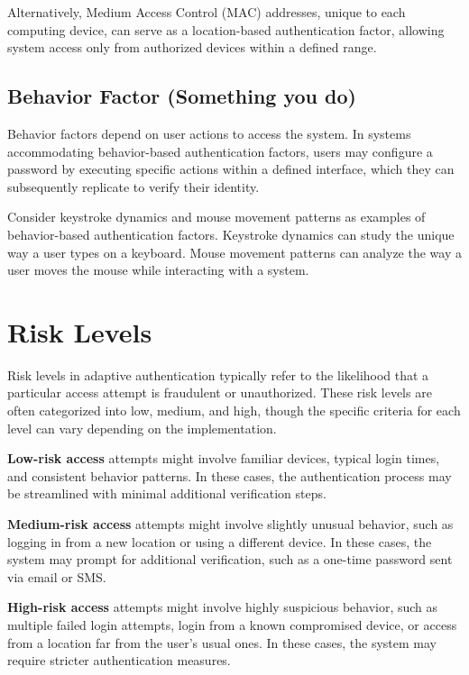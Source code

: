 Alternatively, Medium Access Control (MAC) addresses, unique to each computing device, can serve as a location-based authentication factor, allowing system access only from authorized devices within a defined range.

\newpage
\subsection{Behavior Factor (Something you do)}
Behavior factors depend on user actions to access the system. In systems accommodating behavior-based authentication factors, users may configure a password by executing specific actions within a defined interface, which they can subsequently replicate to verify their identity.

Consider keystroke dynamics and mouse movement patterns as examples of behavior-based authentication factors.
Keystroke dynamics can study the unique way a user types on a keyboard.
Mouse movement patterns can analyze the way a user moves the mouse while interacting with a system. \cite{auth-factors-aratek, auth-factors-sumologic,auth-factors-globalknowledge} 

\section{Risk Levels}
Risk levels in adaptive authentication typically refer to the likelihood that a particular access attempt is fraudulent or unauthorized.
These risk levels are often categorized into low, medium, and high, though the specific criteria for each level can vary depending on the implementation.

\textbf{Low-risk access} attempts might involve familiar devices, typical login times, and consistent behavior patterns. In these cases, the authentication process may be streamlined with minimal additional verification steps.

\textbf{Medium-risk access} attempts might involve slightly unusual behavior, such as logging in from a new location or using a different device.
In these cases, the system may prompt for additional verification, such as a one-time password sent via email or SMS.

\textbf{High-risk access} attempts might involve highly suspicious behavior, such as multiple failed login attempts, login from a known compromised device, or access from a location far from the user's usual ones.
In these cases, the system may require stricter authentication measures.

\shorthandon{-}